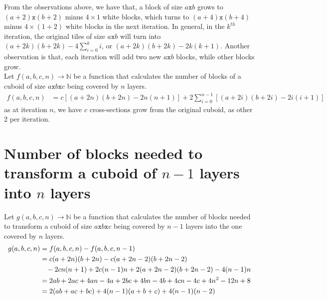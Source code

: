 \documentclass{article}
\begin{document}
\indent From the observations above, we have that, a block of size $a\texttt{x}b$ grows to $(a+2) \texttt{x} (b+2)$ minus $4 \times 1$ white blocks, which turns to $(a+4) \texttt{x} (b+4)$ minus $4 \times (1+2)$ white blocks in the next iteration. 
In general, in the $k^{th}$ iteration, the original tiles of size $a \texttt{x} b$ will turn into $(a+2k)(b+2k)-4\sum_{i=0}^{k}i$, or $(a+2k)(b+2k)-2k(k+1)$. 
Another observation is that, each iteration will add two new $a\texttt{x}b$ blocks, while other blocks grow. \\
\indent Let $f(a,b,c,n) \rightarrow \mathbb{N}$ be a function that calculates the number of blocks of a cuboid of size $a\texttt{x}b\texttt{x}c$ being covered by $n$ layers.
\begin{align*}
    f(a,b,c,n) &= c[(a+2n)(b+2n) - 2n(n+1)] + 2\sum_{i=0}^{n-1}[(a+2i)(b+2i)-2i(i+1)]
\end{align*}
as at iteration $n$, we have $c$ cross-sections grow from the original cuboid, as other 2 per iteration.
\section{Number of blocks needed to transform a cuboid of $n-1$ layers into $n$ layers}
\indent Let $g(a,b,c,n) \rightarrow \mathbb{N}$ be a function that calculates the number of blocks needed to transform a cuboid of size $a\texttt{x}b\texttt{x}c$ being covered by $n-1$ layers into the one covered by $n$ layers.
\begin{align*}
    g(a,b,c,n) &=f(a,b,c,n) - f(a,b,c,n-1)\\
    &=c(a+2n)(b+2n)-c(a+2n-2)(b+2n-2) \\
    & \texttt{\thinspace\thinspace\thinspace\thinspace\thinspace}- 2cn(n+1) + 2c(n-1)n + 2(a+2n-2)(b+2n-2)-4(n-1)n \\
    &=2ab + 2ac + 4an - 4a + 2bc + 4bn - 4b + 4cn - 4c + 4n^2 - 12 n + 8\\
    &=2(ab+ac+bc)+4(n-1)(a+b+c)+4(n-1)(n-2)
\end{align*}
\end{document}
